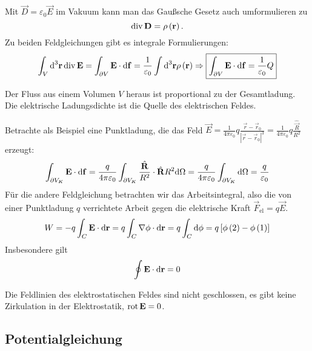 Mit $\vec {D}=\varepsilon _{0}\vec {E}$ im Vakuum kann man das Gaußsche Gesetz auch umformulieren zu
\begin{equation}
	\label{3.6}
	\operatorname{div} \mathbf{D}=\rho \left(\mathbf{r}\right).
\end{equation}
Zu beiden Feldgleichungen gibt es integrale Formulierungen:
\begin{equation*}
	\int _{V}\text{d} ^{3}\mathbf{r}\operatorname{div} \mathbf{E}=\int _{\partial V}\mathbf{E}\cdot \text{d} \mathbf{f}=\frac{1}{\varepsilon _{0}}\int \text{d} ^{3}\mathbf{r}\rho \left(\mathbf{r}\right)\Rightarrow \boxed{\int _{\partial V}\mathbf{E}\cdot \text{d} \mathbf{f}=\frac{1}{\varepsilon _{0}}Q}
\end{equation*}
\begin{formal}
    Der Fluss aus einem Volumen $V$ heraus ist proportional zu der Gesamtladung. Die elektrische Ladungsdichte ist die Quelle des elektrischen Feldes. 
\end{formal}
Betrachte als Beispiel eine Punktladung, die das Feld $\vec {E}=\frac{1}{4\pi \varepsilon _{0}}q\frac{\vec {r}-\vec {r}_{0}}{\left| \vec {r}-\vec {r}_{0}\right| ^{3}}=\frac{1}{4\pi \varepsilon _{0}}q\frac{\hat{\vec {R}}}{R^{2}}$ erzeugt:
\begin{equation*}
	\int _{\partial V_{K}}\mathbf{E}\cdot \text{d} \mathbf{f}=\frac{q}{4\pi \varepsilon _{0}}\int _{\partial V_{K}}\frac{\hat{\mathbf{R}}}{R^{2}}\cdot \hat{\mathbf{R}}R^{2}\text{d} \Omega  =\frac{q}{4\pi \varepsilon _{0}}\int _{\partial V_{K}}\text{d} \Omega  =\frac{q}{\varepsilon _{0}}
\end{equation*}
Für die andere Feldgleichung betrachten wir das Arbeitsintegral, also die von einer Punktladung $q$ verrichtete Arbeit gegen die elektrische Kraft $\vec F_{\mathrm{el}}=q\vec {E}$.
\begin{equation*}
	W=-q\int _{C}\mathbf{E}\cdot \text{d} \mathbf{r}=q\int _{C}\nabla \phi \cdot \text{d} \mathbf{r}=q\int _{C}\text{d} \phi =q\left[\phi \left(2\right)-\phi \left(1\right)\right]
\end{equation*}
Insbesondere gilt
\begin{equation}
	\label{3.7}
	\oint \mathbf{E}\cdot \text{d} \mathbf{r}=0
\end{equation}

\begin{formal}
	Die Feldlinien des elektrostatischen Feldes sind nicht geschlossen, es gibt keine Zirkulation in der Elektrostatik, $\operatorname{rot} \mathbf{E}=0$.
\end{formal}



\subsection{Potentialgleichung}


